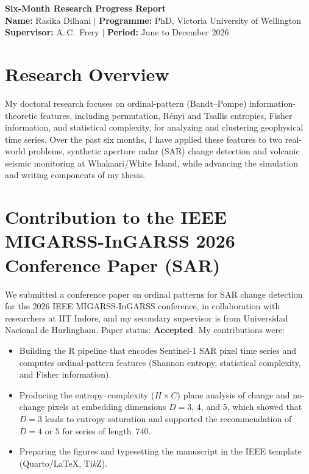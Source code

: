 \documentclass[11pt,a4paper]{article}
\begin{document}
	
	\begin{center}
		{\LARGE\bfseries Six-Month Research Progress Report}\\[1.2ex]
		\textbf{Name:} Rasika Dilhani \quad$|$\quad
		\textbf{Programme:} PhD, Victoria University of Wellington\\[0.4ex]
		\textbf{Supervisor:} A.\,C.~Frery \quad$|$\quad
		\textbf{Period:} June to December 2026
	\end{center}
	
	\section{Research Overview}
	
	My doctoral research focuses on ordinal-pattern (Bandt--Pompe)
	information-theoretic features, including permutation, Rényi and Tsallis
	entropies, Fisher information, and statistical complexity, for analyzing
	and clustering geophysical time series. Over the past six months, I have
	applied these features to two real-world problems, synthetic aperture
	radar (SAR) change detection and volcanic seismic monitoring at
	Whakaari/White Island, while advancing the simulation and writing
	components of my thesis.
	
	\section{Contribution to the IEEE MIGARSS-InGARSS 2026 Conference Paper (SAR)}
	
	We submitted a conference paper on ordinal patterns for SAR change
	detection for the 2026 IEEE MIGARSS-InGARSS conference, in collaboration
	with researchers at IIT Indore, and my secondary supervisor is from
	Universidad Nacional de Hurlingham. Paper status: \textbf{Accepted}. My
	contributions were:
	
	\begin{itemize}
		\item Building the R pipeline that encodes Sentinel-1 SAR pixel time
		series and computes ordinal-pattern features (Shannon entropy,
		statistical complexity, and Fisher information).
		\item Producing the entropy--complexity ($H\times C$) plane analysis of
		change and no-change pixels at embedding dimensions $D = 3$, $4$,
		and $5$, which showed that $D = 3$ leads to entropy saturation and
		supported the recommendation of $D = 4$ or $5$ for series of
		length~740.
		\item Preparing the figures and typesetting the manuscript in the IEEE
		template (Quarto/\LaTeX, Ti\emph{k}Z).
	\end{itemize}
	
\end{document}
